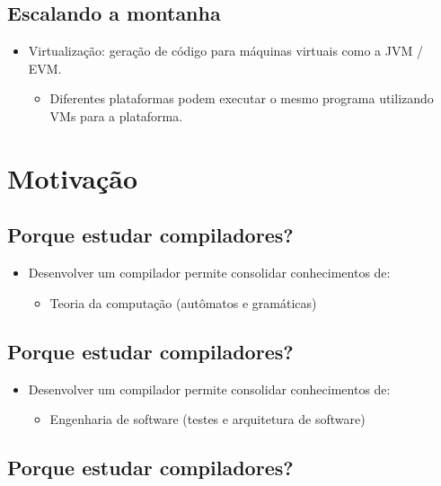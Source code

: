 \documentclass[11pt]{article}
\begin{document}
\subsection*{Escalando a montanha}
\label{sec:orgbb55999}

\begin{itemize}
\item Virtualização: geração de código para máquinas virtuais como a JVM / EVM.
\begin{itemize}
\item Diferentes plataformas podem executar o mesmo programa utilizando VMs para a plataforma.
\end{itemize}
\end{itemize}
\section*{Motivação}
\label{sec:org62a6ed3}

\subsection*{Porque estudar compiladores?}
\label{sec:org9443c19}

\begin{itemize}
\item Desenvolver um compilador permite consolidar conhecimentos de:
\begin{itemize}
\item Teoria da computação (autômatos e gramáticas)
\end{itemize}
\end{itemize}
\subsection*{Porque estudar compiladores?}
\label{sec:org75daf60}

\begin{itemize}
\item Desenvolver um compilador permite consolidar conhecimentos de:
\begin{itemize}
\item Engenharia de software (testes e arquitetura de software)
\end{itemize}
\end{itemize}
\subsection*{Porque estudar compiladores?}
\label{sec:org52b31a7}
\end{document}
